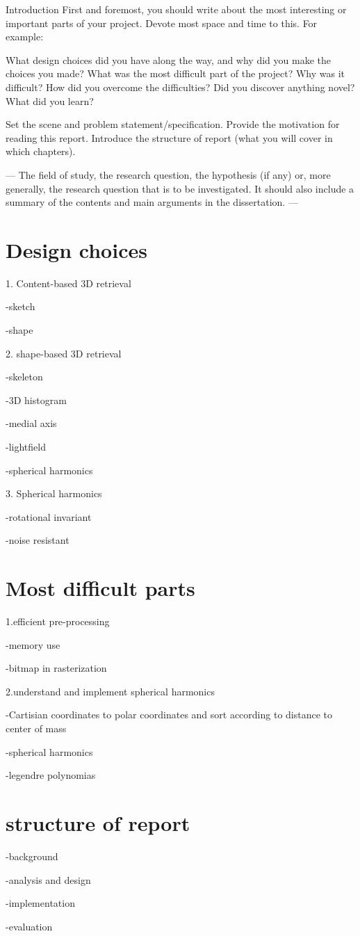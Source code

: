 
Introduction
First and foremost, you should write about the most interesting or important parts of your project. Devote most space and time to this. For example:

 

    What design choices did you have along the way, and why did you make the choices you made?
    What was the most difficult part of the project?
    Why was it difficult?
    How did you overcome the difficulties?
    Did you discover anything novel?
    What did you learn?


Set the scene and problem statement/specification. Provide the motivation for reading this report. Introduce the structure of report (what you will cover in which chapters). 


---
The field of study, the research question, the hypothesis (if any) or, more generally, the research question that is to be investigated. It should also include a summary of the contents and main arguments in the dissertation.
---


\section{Design choices}
1. Content-based 3D retrieval

-sketch

-shape


2. shape-based 3D retrieval

-skeleton

-3D histogram

-medial axis

-lightfield

-spherical harmonics


3. Spherical harmonics

-rotational invariant

-noise resistant



\section{Most difficult parts}

1.efficient pre-processing

-memory use

-bitmap in rasterization


2.understand and implement spherical harmonics

-Cartisian coordinates to polar coordinates and sort according to distance to center of mass

-spherical harmonics

-legendre polynomias


\section{structure of report}

-background

-analysis and design

-implementation

-evaluation


